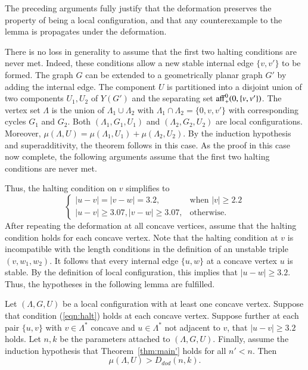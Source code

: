 The preceding arguments fully justify that the deformation preserves
the property of being a local configuration, and that
any counterexample to the lemma is propagates under
the deformation.


There is no loss in generality to assume that the first two halting conditions are never
met.  Indeed, these conditions allow a new stable internal edge $\{v,v'\}$ to be formed.  The
graph $G$ can be extended to a geometrically planar graph $G'$ by adding the internal edge.
The component $U$ is partitioned into a disjoint union of two components $U_1,U_2$ 
of $Y(G')$ and the separating set ${\operatorname{aff}}_+^0(0,\{v,v'\})$.  The vertex set
$\Lambda$ is the union of $\Lambda_1\cup\Lambda_2$ with $\Lambda_1\cap\Lambda_2=\{0,v,v'\}$
with corresponding cycles $G_1$ and $G_2$.  Both $(\Lambda_1,G_1,U_1)$ and $(\Lambda_2,G_2,U_2)$ are local configurations.  Moreover, $\mu(\Lambda,U) = \mu(\Lambda_1,U_1)+\mu(\Lambda_2,U_2)$.  By the induction hypothesis and superadditivity, the theorem follows in this case.
As the proof in this case now complete, the following arguments
assume that the first two halting conditions are never met.

Thus, the halting condition on $v$ simplifies to 
\begin{equation}\label{eqn:halt}
\begin{cases}
|u-v|=|v-w|=3.2,& \text{when } |v|\ge 2.2\\
|u-v|\ge 3.07, |v-w|\ge 3.07,& \text{otherwise.}
\end{cases}
\end{equation}
After repeating the deformation at all concave vertices, assume that the halting condition
holds for each concave vertex.  Note that the halting
condition at $v$ is incompatible with the length conditions in
the definition of an unstable triple $(v,w_1,w_2)$.  It
follows that every internal edge $\{u,w\}$
at a concave vertex $u$ is stable.  By the definition of local configuration, this
implies that $|u-w|\ge 3.2$.  Thus, the hypotheses in the following lemma are fulfilled.

\begin{lemma}\label{lemma:concave}  
Let $(\Lambda,G,U)$ be a local configuration with at least one
concave vertex.  Suppose that 
condition (\ref{eqn:halt}) holds at each concave vertex.  Suppose further at each
pair $\{u,v\}$ with $v\in\Lambda^*$ concave and $u\in\Lambda^*$ not adjacent to $v$,
that $|u-v|\ge 3.2$ holds.   Let $n,k$ be the parameters attached
to $(\Lambda,G,U)$.  Finally, assume the induction hypothesis that Theorem~\ref{thm:main'}
holds for all $n'<n$. Then
   $$\mu(\Lambda,U) > D_{dod}(n,k).$$
\end{lemma}

